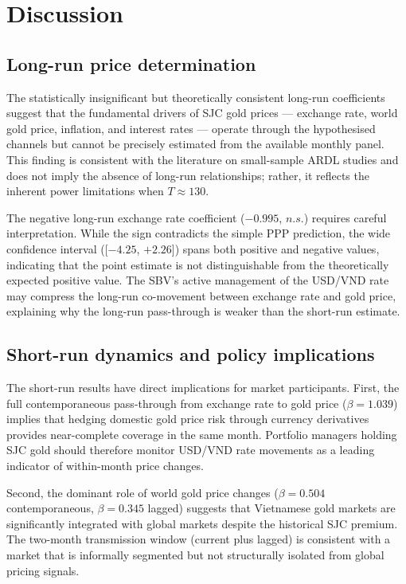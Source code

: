 \documentclass[12pt,a4paper]{article}
\begin{document}
\section{Discussion}
\label{sec:discussion}

\subsection{Long-run price determination}

The statistically insignificant but theoretically consistent long-run
coefficients suggest that the fundamental drivers of SJC gold prices ---
exchange rate, world gold price, inflation, and interest rates --- operate
through the hypothesised channels but cannot be precisely estimated from
the available monthly panel.
This finding is consistent with the literature on small-sample ARDL studies
\citep{pesaran2001, rana2023} and does not imply the absence of long-run
relationships; rather, it reflects the inherent power limitations when
$T \approx 130$.

The negative long-run exchange rate coefficient ($-0.995$, $n.s.$) requires
careful interpretation. While the sign contradicts the simple PPP prediction,
the wide confidence interval ([$-4.25$, $+2.26$]) spans both positive and
negative values, indicating that the point estimate is not distinguishable
from the theoretically expected positive value. The SBV's active management
of the USD/VND rate may compress the long-run co-movement between exchange
rate and gold price, explaining why the long-run pass-through is weaker
than the short-run estimate.

\subsection{Short-run dynamics and policy implications}

The short-run results have direct implications for market participants.
First, the full contemporaneous pass-through from exchange rate to gold
price ($\beta = 1.039$) implies that hedging domestic gold price risk
through currency derivatives provides near-complete coverage in the same
month. Portfolio managers holding SJC gold should therefore monitor
USD/VND rate movements as a leading indicator of within-month price
changes.

Second, the dominant role of world gold price changes ($\beta = 0.504$
contemporaneous, $\beta = 0.345$ lagged) suggests that Vietnamese gold
markets are significantly integrated with global markets despite the
historical SJC premium. The two-month transmission window (current plus
lagged) is consistent with a market that is informally segmented but
not structurally isolated from global pricing signals.
\end{document}
